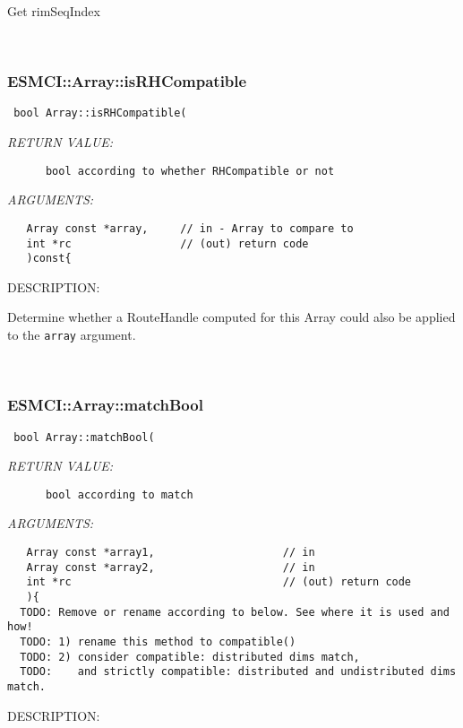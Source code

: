       Get rimSeqIndex
   
 
\mbox{}\hrulefill\
 
\subsubsection [ESMCI::Array::isRHCompatible] {ESMCI::Array::isRHCompatible}


  
\begin{verbatim} bool Array::isRHCompatible(\end{verbatim}{\em RETURN VALUE:}
\begin{verbatim}      bool according to whether RHCompatible or not\end{verbatim}{\em ARGUMENTS:}
\begin{verbatim}   Array const *array,     // in - Array to compare to
   int *rc                 // (out) return code
   )const{\end{verbatim}
{\sf DESCRIPTION:\\ }


      Determine whether a RouteHandle computed for this Array could also be
      applied to the {\tt array} argument.
   
 
\mbox{}\hrulefill\
 
\subsubsection [ESMCI::Array::matchBool] {ESMCI::Array::matchBool}


  
\begin{verbatim} bool Array::matchBool(\end{verbatim}{\em RETURN VALUE:}
\begin{verbatim}      bool according to match\end{verbatim}{\em ARGUMENTS:}
\begin{verbatim}   Array const *array1,                    // in
   Array const *array2,                    // in
   int *rc                                 // (out) return code
   ){
  TODO: Remove or rename according to below. See where it is used and how!
  TODO: 1) rename this method to compatible()
  TODO: 2) consider compatible: distributed dims match,
  TODO:    and strictly compatible: distributed and undistributed dims match.\end{verbatim}
{\sf DESCRIPTION:\\ }


